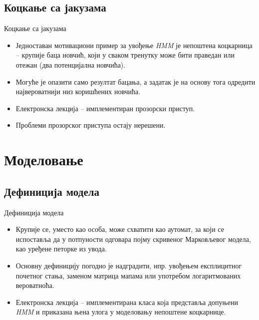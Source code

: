 \documentclass[hyperref={bookmarks=false}]{beamer}
\begin{document}
\subsection{Коцкање са јакузама}
\begin{frame}{Коцкање са јакузама}
\begin{itemize}
\item Једноставан мотивациони пример за увођење \textit{HMM} је непоштена коцкарница -- крупије баца новчић, који у сваком тренутку може бити праведан или отежан (два потенцијална новчића).
\item Могуће је опазити само резултат бацања, а задатак је на основу тога одредити највероватнији низ коришћених новчића.
\item Електронска лекција -- имплементиран прозорски приступ.
\item Проблеми прозорског приступа остају нерешени.
\end{itemize}
\end{frame}

\section{Моделовање}
\subsection{Дефиниција модела}
\begin{frame}{Дефиниција модела}
\begin{itemize}
\item Крупије се, уместо као особа, може схватити као аутомат, за који се испоставља да у потпуности одговара појму скривеног Марковљевог модела, као уређене петорке из увода.
\item Основну дефиницију погодно је надградити, нпр. увођењем експлицитног почетног стања, заменом матрица мапама или употребом логаритмованих вероватноћа.
\item Електронска лекција -- имплементирана класа која представља допуњени \textit{HMM} и приказана њена улога у моделовању непоштене коцкарнице.
\end{itemize}
\end{frame}
\end{document}
